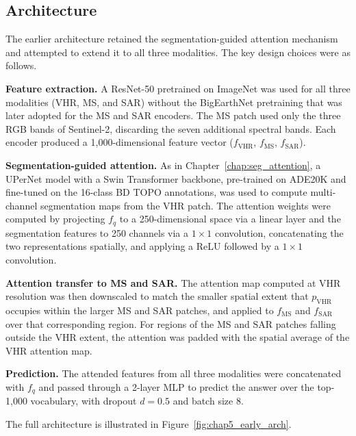 \subsection{Architecture}
\label{sec:chap5_seg_arch}

The earlier architecture retained the segmentation-guided
attention mechanism and attempted to extend it to all three modalities.
The key design choices were as follows.

\textbf{Feature extraction.} A ResNet-50 pretrained on
ImageNet was used for all three modalities (VHR, MS,
and SAR) without the BigEarthNet pretraining that was
later adopted for the MS and SAR encoders. The MS patch
used only the three RGB bands of Sentinel-2, discarding
the seven additional spectral bands. Each encoder produced
a 1,000-dimensional feature vector ($f_\text{VHR}$,
$f_\text{MS}$, $f_\text{SAR}$).

\textbf{Segmentation-guided attention.} As in
Chapter~\ref{chap:seg_attention}, a UPerNet model with a
Swin Transformer backbone, pre-trained on ADE20K and
fine-tuned on the 16-class BD TOPO annotations, was used
to compute multi-channel segmentation maps from the VHR
patch. The attention weights were computed by projecting
$f_q$ to a 250-dimensional space via a linear layer and
the segmentation features to 250 channels via a $1 \times
1$ convolution, concatenating the two representations
spatially, and applying a ReLU followed by a $1 \times 1$
convolution. 

\textbf{Attention transfer to MS and SAR.} The attention
map computed at VHR resolution was then downscaled
to match the smaller spatial extent that $p_\text{VHR}$
occupies within the larger MS and SAR patches, and
applied to $f_\text{MS}$ and $f_\text{SAR}$ over that
corresponding region. For regions of the MS and SAR patches falling
outside the VHR extent, the attention was padded with the
spatial average of the VHR attention map.

\textbf{Prediction.} The attended features from all three
modalities were concatenated with $f_q$ and passed through
a 2-layer MLP to predict the answer over the top-1,000
vocabulary, with dropout $d = 0.5$ and batch size 8.

The full architecture is illustrated in
Figure~\ref{fig:chap5_early_arch}.


